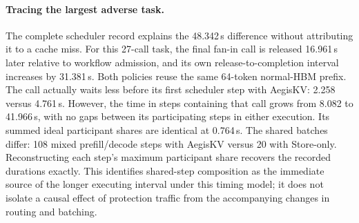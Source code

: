\paragraph{Tracing the largest adverse task.}
The complete scheduler record explains the 48.342\,s difference without
attributing it to a cache miss. For this 27-call task, the final fan-in call
is released 16.961\,s later relative to workflow admission, and its own
release-to-completion interval increases by 31.381\,s. Both policies reuse
the same 64-token normal-HBM prefix. The call actually waits less before
its first scheduler step with AegisKV: 2.258 versus 4.761\,s. However,
the time in steps containing that call grows from 8.082 to 41.966\,s,
with no gaps between its participating steps in either execution.
Its summed ideal participant shares are identical at 0.764\,s. The
shared batches differ: 108 mixed prefill/decode steps with AegisKV versus
20 with Store-only. Reconstructing each step's maximum participant share
recovers the recorded durations exactly. This identifies shared-step
composition as the immediate source of the longer executing interval
under this timing model; it does not isolate a causal effect of protection
traffic from the accompanying changes in routing and batching.
